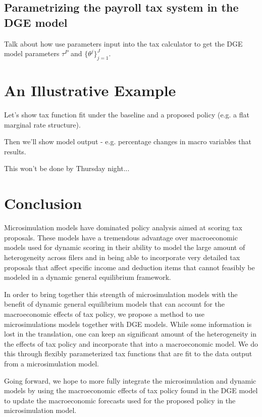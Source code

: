 \documentclass[letterpaper,12pt]{article}
\theoremstyle{definition}
\begin{document}
\begin{spacing}{1.5}
\subsection{Parametrizing the payroll tax system in the DGE model}\label{SecPayrollDGE}

Talk about how use parameters input into the tax calculator to get the DGE model parameters  $\tau^P$ and $\{\theta^j\}_{j=1}^J$.

\section{An Illustrative Example}\label{SecResults}

Let's show tax function fit under the baseline and a proposed policy (e.g. a flat marginal rate structure).  

Then we'll show model output - e.g. percentage changes in macro variables that results.

This won't be done by Thursday night...

\section{Conclusion}\label{SecConclusion}

  Microsimulation models have dominated policy analysis aimed at scoring tax proposals.  These models have a tremendous advantage over macroeconomic models used for dynamic scoring in their ability to model the large amount of heterogeneity across filers and in being able to incorporate very detailed tax proposals that affect specific income and deduction items that cannot feasibly be modeled in a dynamic general equilibrium framework.  
  
 In order to bring together this strength of microsimulation models with the benefit of dynamic general equilibrium models that can account for the macroeconomic effects of tax policy, we propose a method to use microsimulations models together with DGE models.  While some information is lost in the translation, one can keep an significant amount of the heterogeneity in the effects of tax policy and incorporate that into a macroeconomic model.  We do this through flexibly parameterized tax functions that are fit to the data output from a microsimulation model.
 
 Going forward, we hope to more fully integrate the microsimulation and dynamic models by using the macroeconomic effects of tax policy found in the DGE model to update the macroeconomic forecasts used for the proposed policy in the microsimulation model.


\clearpage

\end{spacing}
\end{document}

